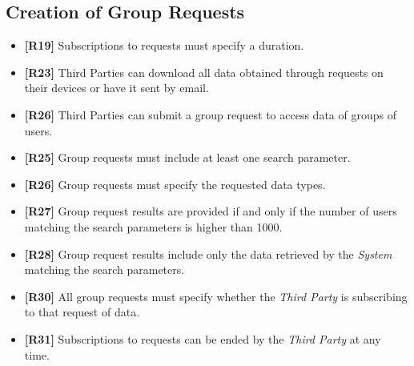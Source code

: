 \documentclass[titlepage]{article}
\begin{document}
	
	\subsection{Creation of Group Requests}
	\begin{itemize}
		\item {\bf [R19]} Subscriptions to requests must specify a duration.
		\item {\bf [R23]} Third Parties can download all data obtained through requests on their devices or have it sent by email.
		\item {\bf [R26]} Third Parties can submit a group request to access data of groups of users. 
		\item {\bf [R25]} Group requests must include at least one search parameter.
		\item {\bf [R26]} Group requests must specify the requested data types. 
		\item {\bf [R27]} Group request results are provided if and only if the number of users matching the search parameters is higher than 1000. 
		\item {\bf [R28]} Group request results include only the data retrieved by the {\it System} matching the search parameters. 
		\item {\bf [R30]} All group requests must specify whether the {\it Third Party} is subscribing to that request of data. 
		\item {\bf [R31]} Subscriptions to requests can be ended by the {\it Third Party} at any time.
	\end{itemize}	
	
\end{document}

